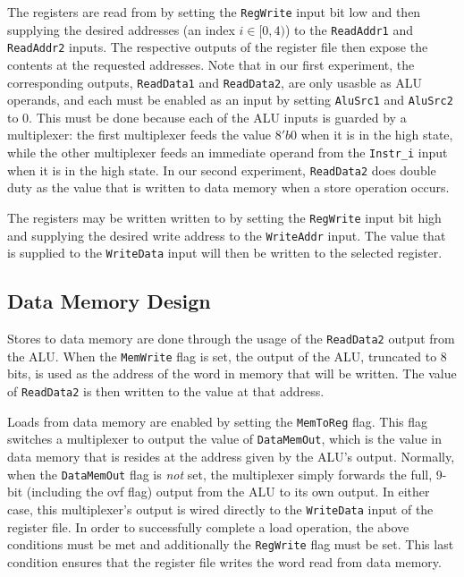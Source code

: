 \documentclass[12pt, letterpaper]{article}
\begin{document}
The registers are read from by setting the \texttt{RegWrite} input bit low and then supplying the desired addresses (an index $i \in [0, 4)$) to the \texttt{ReadAddr1} and \texttt{ReadAddr2} inputs.  The respective outputs of the register file then expose the contents at the requested addresses.  Note that in our first experiment, the corresponding outputs, \texttt{ReadData1} and \texttt{ReadData2}, are only usasble as ALU operands, and each must be enabled as an input by setting \texttt{AluSrc1} and \texttt{AluSrc2} to $0$.  This must be done because each of the ALU inputs is guarded by a multiplexer: the first multiplexer feeds the value $8'b0$ when it is in the high state, while the other multiplexer feeds an immediate operand from the \texttt{Instr\_i} input when it is in the high state.  In our second experiment, \texttt{ReadData2} does double duty as the value that is written to data memory when a store operation occurs. 

The registers may be written written to by setting the \texttt{RegWrite} input bit high and supplying the desired write address to the \texttt{WriteAddr} input.  The value that is supplied to the \texttt{WriteData} input will then be written to the selected register.

\subsection{Data Memory Design}
Stores to data memory are done through the usage of the \texttt{ReadData2} output from the ALU.  When the \texttt{MemWrite} flag is set, the output of the ALU, truncated to 8 bits, is used as the address of the word in memory that will be written.  The value of \texttt{ReadData2} is then written to the value at that address.  

Loads from data memory are enabled by setting the \texttt{MemToReg} flag.  This flag switches a multiplexer to output the value of \texttt{DataMemOut}, which is the value in data memory that is resides at the address given by the ALU's output.  Normally, when the \texttt{DataMemOut} flag is \emph{not} set, the multiplexer simply forwards the full, 9-bit (including the ovf flag) output from the ALU to its own output.  In either case, this multiplexer's output is wired directly to the \texttt{WriteData} input of the register file.  In order to successfully complete a load operation, the above conditions must be met and additionally the \texttt{RegWrite} flag must be set.  This last condition ensures that the register file writes the word read from data memory.
\end{document}
